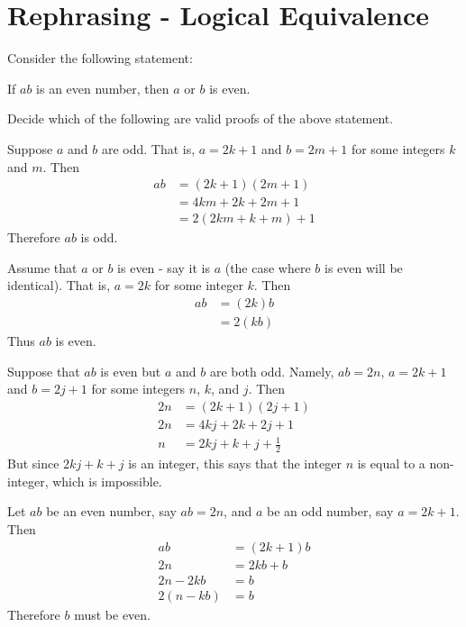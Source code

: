 \documentclass[12pt]{article}
\begin{document}
\section{Rephrasing - Logical Equivalence}

\begin{activity}
Consider the following statement: 
\begin{center}
If $a b$ is an even number, then $a$ or $b$ is even.
\end{center}
Decide which of the following are valid proofs of the above statement.
\begin{questions}
\question
Suppose $a$ and $b$ are odd.  That is, $a=2k+1$ and $b=2m+1$ for some integers $k$ and $m$. Then 
\begin{align*} 
ab &=(2k+1)(2m+1)\\
&=4km+2k+2m+1\\
&=2(2km+k+m)+1
\end{align*}
Therefore $ab$ is odd.
\vfill

\question
Assume that $a$ or $b$ is even - say it is $a$ (the case where $b$ is even will be identical). That is, $a=2k$ for some integer $k$. Then 
\begin{align*} 
ab &=(2k)b\\
&=2(kb)
\end{align*} 
Thus $ab$ is even.  
\vfill

\question
Suppose that $ab$ is even but $a$ and $b$ are both odd. Namely, $ab = 2n$, $a=2k+1$ and $b=2j+1$ for some integers $n$, $k$, and $j$. Then 
\begin{align*} 
2n &=(2k+1)(2j+1)\\
2n &=4kj+2k+2j+1\\
n &= 2kj+k+j+\frac{1}{2}
\end{align*}
But since $2kj+k+j$ is an integer, this says that the integer $n$ is equal to a non-integer, which is impossible.
\vfill

\question 
Let $ab$ be an even number, say $ab=2n$, and $a$ be an odd number, say $a=2k+1$. Then
\begin{align*} 
ab &=(2k+1)b\\
2n &=2kb+b\\
2n-2kb&=b\\
2(n-kb)&=b
\end{align*}
Therefore $b$ must be even.
\end{questions}
\end{activity}
\end{document}
